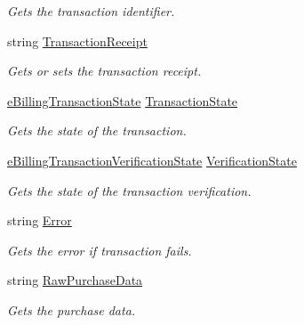 \begin{DoxyCompactItemize}
\begin{DoxyCompactList}\small\item\em Gets the transaction identifier. \end{DoxyCompactList}\item 
string \hyperlink{class_voxel_busters_1_1_native_plugins_1_1_billing_transaction_ad0f9bdbf147f11815849a829035b6378}{Transaction\+Receipt}
\begin{DoxyCompactList}\small\item\em Gets or sets the transaction receipt. \end{DoxyCompactList}\item 
\hyperlink{namespace_voxel_busters_1_1_native_plugins_a1b545f54cd8f7e04410c379e01ff27f2}{e\+Billing\+Transaction\+State} \hyperlink{class_voxel_busters_1_1_native_plugins_1_1_billing_transaction_a19bbd3b049d8d17a9ce4336540931e84}{Transaction\+State}
\begin{DoxyCompactList}\small\item\em Gets the state of the transaction. \end{DoxyCompactList}\item 
\hyperlink{namespace_voxel_busters_1_1_native_plugins_adebe7e13622c835cd0cd075be41b2003}{e\+Billing\+Transaction\+Verification\+State} \hyperlink{class_voxel_busters_1_1_native_plugins_1_1_billing_transaction_ae25e822a1c56729c96fc4aa128af3364}{Verification\+State}
\begin{DoxyCompactList}\small\item\em Gets the state of the transaction verification. \end{DoxyCompactList}\item 
string \hyperlink{class_voxel_busters_1_1_native_plugins_1_1_billing_transaction_a103401a9be7315c9eb92e30c9946b296}{Error}
\begin{DoxyCompactList}\small\item\em Gets the error if transaction fails. \end{DoxyCompactList}\item 
string \hyperlink{class_voxel_busters_1_1_native_plugins_1_1_billing_transaction_a9f54539b03d439560c70298048d48d5d}{Raw\+Purchase\+Data}
\begin{DoxyCompactList}\small\item\em Gets the purchase data. \end{DoxyCompactList}\end{DoxyCompactItemize}


